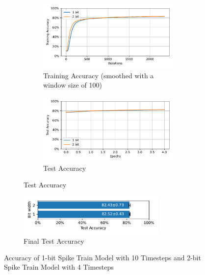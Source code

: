         \begin{figure}[H]
            \centering
            \begin{subfigure}[H]{\textwidth}
                \centering
                \begin{subfigure}[H]{\textwidth}
                    \includegraphics[width=\textwidth]{../timesteps/FashionMNIST/plots/fashionmnist_train_acc.pdf}
                    \caption{Training Accuracy (smoothed with a window size of 100)}
                \end{subfigure}
                \hfill
                \begin{subfigure}[H]{\textwidth}
                    \includegraphics[width=\textwidth]{../timesteps/FashionMNIST/plots/fashionmnist_test_acc.pdf}
                    \caption{Test Accuracy}
                \end{subfigure}
            \end{subfigure}
            \hfill
            \begin{subfigure}[H]{\textwidth}
                \centering
                \includegraphics[width=0.8\textwidth]{../timesteps/FashionMNIST/plots/fashionmnist_final_acc_horizontal.pdf}
                \caption{Final Test Accuracy}
            \end{subfigure}
            \caption{Accuracy of 1-bit Spike Train Model with 10 Timesteps and 2-bit Spike Train Model with 4 Timesteps}
        \end{figure}

